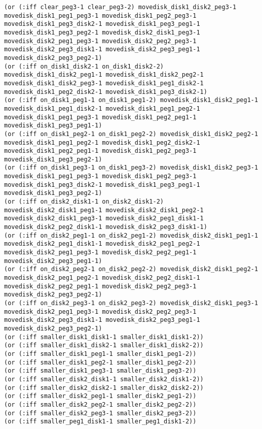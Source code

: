\documentclass[12pt,letterpaper]{ntdhw}
\begin{document}
\begin{enumerate}
\begin{enumerate}
\begin{lstlisting}[language=pddl, style=pddlstyle,
  basicstyle=\scriptsize]
(or (:iff clear_peg3-1 clear_peg3-2) movedisk_disk1_disk2_peg3-1 movedisk_disk1_peg1_peg3-1 movedisk_disk1_peg2_peg3-1 movedisk_disk1_peg3_disk2-1 movedisk_disk1_peg3_peg1-1 movedisk_disk1_peg3_peg2-1 movedisk_disk2_disk1_peg3-1 movedisk_disk2_peg1_peg3-1 movedisk_disk2_peg2_peg3-1 movedisk_disk2_peg3_disk1-1 movedisk_disk2_peg3_peg1-1 movedisk_disk2_peg3_peg2-1)
(or (:iff on_disk1_disk2-1 on_disk1_disk2-2) movedisk_disk1_disk2_peg1-1 movedisk_disk1_disk2_peg2-1 movedisk_disk1_disk2_peg3-1 movedisk_disk1_peg1_disk2-1 movedisk_disk1_peg2_disk2-1 movedisk_disk1_peg3_disk2-1)
(or (:iff on_disk1_peg1-1 on_disk1_peg1-2) movedisk_disk1_disk2_peg1-1 movedisk_disk1_peg1_disk2-1 movedisk_disk1_peg1_peg2-1 movedisk_disk1_peg1_peg3-1 movedisk_disk1_peg2_peg1-1 movedisk_disk1_peg3_peg1-1)
(or (:iff on_disk1_peg2-1 on_disk1_peg2-2) movedisk_disk1_disk2_peg2-1 movedisk_disk1_peg1_peg2-1 movedisk_disk1_peg2_disk2-1 movedisk_disk1_peg2_peg1-1 movedisk_disk1_peg2_peg3-1 movedisk_disk1_peg3_peg2-1)
(or (:iff on_disk1_peg3-1 on_disk1_peg3-2) movedisk_disk1_disk2_peg3-1 movedisk_disk1_peg1_peg3-1 movedisk_disk1_peg2_peg3-1 movedisk_disk1_peg3_disk2-1 movedisk_disk1_peg3_peg1-1 movedisk_disk1_peg3_peg2-1)
(or (:iff on_disk2_disk1-1 on_disk2_disk1-2) movedisk_disk2_disk1_peg1-1 movedisk_disk2_disk1_peg2-1 movedisk_disk2_disk1_peg3-1 movedisk_disk2_peg1_disk1-1 movedisk_disk2_peg2_disk1-1 movedisk_disk2_peg3_disk1-1)
(or (:iff on_disk2_peg1-1 on_disk2_peg1-2) movedisk_disk2_disk1_peg1-1 movedisk_disk2_peg1_disk1-1 movedisk_disk2_peg1_peg2-1 movedisk_disk2_peg1_peg3-1 movedisk_disk2_peg2_peg1-1 movedisk_disk2_peg3_peg1-1)
(or (:iff on_disk2_peg2-1 on_disk2_peg2-2) movedisk_disk2_disk1_peg2-1 movedisk_disk2_peg1_peg2-1 movedisk_disk2_peg2_disk1-1 movedisk_disk2_peg2_peg1-1 movedisk_disk2_peg2_peg3-1 movedisk_disk2_peg3_peg2-1)
(or (:iff on_disk2_peg3-1 on_disk2_peg3-2) movedisk_disk2_disk1_peg3-1 movedisk_disk2_peg1_peg3-1 movedisk_disk2_peg2_peg3-1 movedisk_disk2_peg3_disk1-1 movedisk_disk2_peg3_peg1-1 movedisk_disk2_peg3_peg2-1)
(or (:iff smaller_disk1_disk1-1 smaller_disk1_disk1-2))
(or (:iff smaller_disk1_disk2-1 smaller_disk1_disk2-2))
(or (:iff smaller_disk1_peg1-1 smaller_disk1_peg1-2))
(or (:iff smaller_disk1_peg2-1 smaller_disk1_peg2-2))
(or (:iff smaller_disk1_peg3-1 smaller_disk1_peg3-2))
(or (:iff smaller_disk2_disk1-1 smaller_disk2_disk1-2))
(or (:iff smaller_disk2_disk2-1 smaller_disk2_disk2-2))
(or (:iff smaller_disk2_peg1-1 smaller_disk2_peg1-2))
(or (:iff smaller_disk2_peg2-1 smaller_disk2_peg2-2))
(or (:iff smaller_disk2_peg3-1 smaller_disk2_peg3-2))
(or (:iff smaller_peg1_disk1-1 smaller_peg1_disk1-2))

\end{lstlisting}
\end{enumerate}
\end{enumerate}
\end{document}
